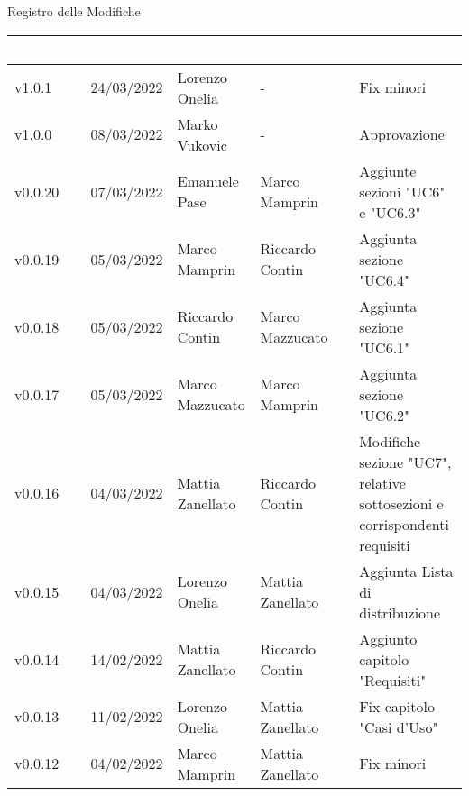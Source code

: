 \begin{center}
  \huge{Registro delle Modifiche}
\end{center}

\renewcommand\arraystretch{1,5}
{\centering
\begin{longtable}{|C{1.8cm}|C{2.1cm}|C{2cm}|C{2.4cm}|L{4.4cm}|}
  \hline
  \textcolor[HTML]{FFFFFF}{\textbf{Versione}} & \textcolor[HTML]{FFFFFF}{\textbf{Data}} & \textcolor[HTML]{FFFFFF}{\textbf{Autore}}  & \textcolor[HTML]{FFFFFF}{\textbf{Verificatore}} & \textcolor[HTML]{FFFFFF}{\textbf{Modifica}}    \\ \hline
  v1.0.1        & 24/03/2022    & Lorenzo Onelia  & -     & Fix minori                  \\ \hline
  v1.0.0           & 08/03/2022   & Marko Vukovic & - & Approvazione     \\ \hline
  v0.0.20           & 07/03/2022    & Emanuele Pase  & Marco Mamprin         & Aggiunte sezioni "UC6" e "UC6.3" \\ \hline
  v0.0.19           & 05/03/2022    & Marco Mamprin  &  Riccardo Contin   & Aggiunta sezione "UC6.4"                   \\ \hline
  v0.0.18           & 05/03/2022    & Riccardo Contin &  Marco Mazzucato    & Aggiunta sezione "UC6.1" \\ \hline
  v0.0.17           & 05/03/2022    & Marco Mazzucato  & Marco Mamprin     & Aggiunta sezione "UC6.2"   \\ \hline
  v0.0.16           & 04/03/2022    & Mattia Zanellato &  Riccardo Contin      & Modifiche sezione "UC7", relative sottosezioni e corrispondenti requisiti \\ \hline
  v0.0.15       & 04/03/2022    & Lorenzo Onelia  & Mattia Zanellato     & Aggiunta Lista di distribuzione                  \\ \hline
  v0.0.14           & 14/02/2022    & Mattia Zanellato  & Riccardo Contin     & Aggiunto capitolo "Requisiti"                   \\ \hline
  v0.0.13           & 11/02/2022    & Lorenzo Onelia    & Mattia Zanellato    & Fix capitolo "Casi d'Uso"                       \\ \hline
  v0.0.12           & 04/02/2022    & Marco Mamprin     & Mattia Zanellato    & Fix minori                                      \\ \hline

\end{longtable}}
